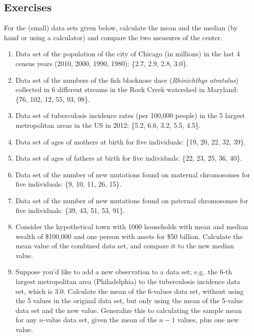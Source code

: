 \documentclass[
]{book}
\theoremstyle{definition}
\theoremstyle{definition}
\theoremstyle{definition}
\theoremstyle{remark}
\begin{document}
\hypertarget{exercises-6}{%
\subsection{Exercises}\label{exercises-6}}

For the (small) data sets given below, calculate the mean and the median (by hand or using a calculator) and compare the two measures of the center.

\begin{enumerate}
\def\labelenumi{\arabic{enumi}.}
\item
  Data set of the population of the city of Chicago (in millions) in the last 4 census years (2010, 2000, 1990, 1980): \{2.7, 2.9, 2.8, 3.0\}.
\item
  Data set of the numbers of the fish blacknose dace (\emph{Rhinichthys atratulus}) collected in 6 different streams in the Rock Creek watershed in Maryland: \{76, 102, 12, 55, 93, 98\}.
\item
  Data set of tuberculosis incidence rates (per 100,000 people) in the 5 largest metropolitan areas in the US in 2012: \{5.2, 6.6, 3.2, 5.5, 4.5\}.
\item
  Data set of ages of mothers at birth for five individuals: \{19, 20, 22, 32, 39\}.
\item
  Data set of ages of fathers at birth for five individuals: \{22, 23, 25, 36, 40\}.
\item
  Data set of the number of new mutations found on maternal chromosomes for five individuals: \{9, 10, 11, 26, 15\}.
\item
  Data set of the number of new mutations found on paternal chromosomes for five individuals: \{39, 43, 51, 53, 91\}.
\item
  Consider the hypothetical town with 1000 households with mean and median wealth of \$100,000 and one person with assets for \$50 billion. Calculate the mean value of the combined data set, and compare it to the new median value.
\item
  Suppose you'd like to add a new observation to a data set; e.g.~the 6-th largest metropolitan area (Philadelphia) to the tuberculosis incidence data set, which is 3.0. Calculate the mean of the 6-values data set, without using the 5 values in the original data set, but only using the mean of the 5-value data set and the new value. Generalize this to calculating the sample mean for any \(n\)-value data set, given the mean of the \(n-1\) values, plus one new value.
\end{enumerate}
\end{document}
